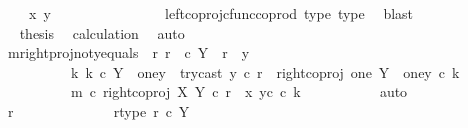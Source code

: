 \begin{isabellebody}
\ {\isachardoublequoteopen}{\isachardot}{\kern0pt}{\isachardot}{\kern0pt}{\isachardot}{\kern0pt}\ {\isacharequal}{\kern0pt}\ \ {\isasymlangle}x{}{\isacharcomma}{\kern0pt}\ y{}{\isasymrangle}{\isachardoublequoteclose}\isanewline
\ \ \ \ \ \ \ \ \ \ \ \ \ \ \isamarkupfalse%
\ left{\isacharunderscore}{\kern0pt}coproj{\isacharunderscore}{\kern0pt}cfunc{\isacharunderscore}{\kern0pt}coprod\ type{}\ type{}\ \isamarkupfalse%
\ blast\isanewline
\ \ \ \ \ \ \ \ \ \ \ \ \isamarkupfalse%
\ \isamarkupfalse%
\ {\isacharquery}{\kern0pt}thesis\ \isamarkupfalse%
\ calculation\ \isamarkupfalse%
\ auto\isanewline
\ \ \ \ \ \ \ \ \ \ \isamarkupfalse%
\isanewline
\isanewline
\ \ \ \ \ \isamarkupfalse%
\ m{\isacharunderscore}{\kern0pt}rightproj{\isacharunderscore}{\kern0pt}not{\isacharunderscore}{\kern0pt}y{}{\isacharunderscore}{\kern0pt}equals{\isacharcolon}{\kern0pt}\ {\isachardoublequoteopen}{\isasymAnd}\ r{\isachardot}{\kern0pt}\ r\ \ {\isasymin}\isactrlsub c\ Y\ {\isasymand}\ r\ {\isasymnoteq}\ y{}\ {\isasymLongrightarrow}\isanewline
\ \ \ \ \ \ \ \ \ \ {\isasymexists}k{\isachardot}{\kern0pt}\ k\ {\isasymin}\isactrlsub c\ Y\ {\isasymsetminus}\ {\isacharparenleft}{\kern0pt}one{\isacharcomma}{\kern0pt}y{}{\isacharparenright}{\kern0pt}\ {\isasymand}\ try{\isacharunderscore}{\kern0pt}cast\ y{}\ {\isasymcirc}\isactrlsub c\ r\ {\isacharequal}{\kern0pt}\ right{\isacharunderscore}{\kern0pt}coproj\ one\ {\isacharparenleft}{\kern0pt}Y\ {\isasymsetminus}\ {\isacharparenleft}{\kern0pt}one{\isacharcomma}{\kern0pt}y{}{\isacharparenright}{\kern0pt}{\isacharparenright}{\kern0pt}\ {\isasymcirc}\isactrlsub c\ k\ {\isasymand}\ \isanewline
\ \ \ \ \ \ \ \ \ \ m\ {\isasymcirc}\isactrlsub c\ right{\isacharunderscore}{\kern0pt}coproj\ X\ Y\ {\isasymcirc}\isactrlsub c\ r\ {\isacharequal}{\kern0pt}\ {\isasymlangle}x{}{\isacharcomma}{\kern0pt}\ y{}\isactrlsup c\ {\isasymcirc}\isactrlsub c\ k{\isasymrangle}{\isachardoublequoteclose}\isanewline
\ \ \ \ \ \ \ \ \ \ \isamarkupfalse%
{\isacharparenleft}{\kern0pt}auto{\isacharparenright}{\kern0pt}\isanewline
\ \ \ \ \ \ \ \ \ \ \ \isamarkupfalse%
\ r\ \isanewline
\ \ \ \ \ \ \ \ \ \ \ \isamarkupfalse%
\ r{\isacharunderscore}{\kern0pt}type{\isacharcolon}{\kern0pt}\ {\isachardoublequoteopen}r\ {\isasymin}\isactrlsub c\ Y{\isachardoublequoteclose}\isanewline

\end{isabellebody}
